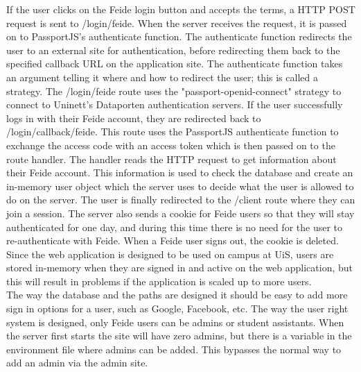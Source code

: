 If the user clicks on the Feide login button and accepts the terms, a HTTP POST request is sent to /login/feide. When the server receives the request, it is passed on to PassportJS's authenticate function. The authenticate function redirects the user to an external site for authentication, before redirecting them back to the specified callback URL on the application site. The authenticate function takes an argument telling it where and how to redirect the user; this is called a strategy. The /login/feide route uses the "passport-openid-connect" strategy to connect to Uninett's Dataporten authentication servers. If the user successfully logs in with their Feide account, they are redirected back to /login/callback/feide. This route uses the PassportJS authenticate function to exchange the access code with an access token which is then passed on to the route handler. The handler reads the HTTP request to get information about their Feide account. This information is used to check the database and create an in-memory user object which the server uses to decide what the user is allowed to do on the server. The user is finally redirected to the /client route where they can join a session. The server also sends a cookie for Feide users so that they will stay authenticated for one day, and during this time there is no need for the user to re-authenticate with Feide. When a Feide user signs out, the cookie is deleted. Since the web application is designed to be used on campus at UiS, users are stored in-memory when they are signed in and active on the web application, but this will result in problems if the application is scaled up to more users.
\\[11pt]
The way the database and the paths are designed it should be easy to add more sign in options for a user, such as Google, Facebook, etc. The way the user right system is designed, only Feide users can be admins or student assistants. When the server first starts the site will have zero admins, but there is a variable in the environment file where admins can be added. This bypasses the normal way to add an admin via the admin site.